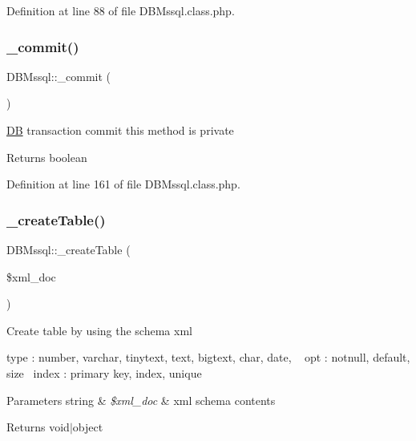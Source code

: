 Definition at line 88 of file D\+B\+Mssql.\+class.\+php.

\mbox{\label{classDBMssql_a08f359cc1c5ce91fde7139446252e8c4}} 
\subsubsection{\texorpdfstring{\+\_\+commit()}{\_commit()}}
{\footnotesize\ttfamily D\+B\+Mssql\+::\+\_\+commit (\begin{DoxyParamCaption}{ }\end{DoxyParamCaption})}

\hyperlink{classDB}{DB} transaction commit this method is private \begin{DoxyReturn}{Returns}
boolean 
\end{DoxyReturn}


Definition at line 161 of file D\+B\+Mssql.\+class.\+php.

\mbox{\label{classDBMssql_a0705365081b34014652f440380c53519}} 
\subsubsection{\texorpdfstring{\+\_\+create\+Table()}{\_createTable()}}
{\footnotesize\ttfamily D\+B\+Mssql\+::\+\_\+create\+Table (\begin{DoxyParamCaption}\item[{}]{\$xml\+\_\+doc }\end{DoxyParamCaption})}

Create table by using the schema xml

type \+: number, varchar, tinytext, text, bigtext, char, date, ~\newline
opt \+: notnull, default, size~\newline
index \+: primary key, index, unique~\newline

\begin{DoxyParams}[1]{Parameters}
string & {\em \$xml\+\_\+doc} & xml schema contents \\
\hline
\end{DoxyParams}
\begin{DoxyReturn}{Returns}
void$\vert$object 
\end{DoxyReturn}


